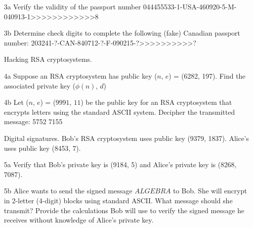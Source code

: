 \begin{question}{3a}
Verify the validity of the passport number
044455533-1-USA-460920-5-M-040913-1>>>>>>>>>>>>8
\end{question}

\begin{question}{3b}
Determine check digits to complete the following (fake) Canadian passport number:
203241-?-CAN-840712-?-F-090215-?>>>>>>>>>>?
\end{question}


\begin{question}{4}
Hacking RSA cryptosystems.
\end{question}

\begin{question}{4a}
Suppose an RSA cryptosystem has public key ($n$, $e$) = (6282, 197). Find the associated private key ($\phi(n)$, $d$)
\end{question}

\begin{question}{4b}
Let ($n$, $e$) = ($9991$, $11$) be the public key for an RSA cryptosystem that encrypts
letters using the standard ASCII system. Decipher the transmitted message: 5752 7155
\end{question}


\begin{question}{5}
Digital signatures. Bob's RSA cryptosystem uses public key (9379, 1837). Alice's uses
public key (8453, 7).
\end{question}

\begin{question}{5a}
Verify that Bob's private key is (9184, 5) and Alice's private key is (8268, 7087).
\end{question}

\begin{question}{5b}
Alice wants to send the signed message $ALGEBRA$ to Bob. She will encrypt in
2-letter (4-digit) blocks using standard ASCII. What message should she transmit? Provide
the calculations Bob will use to verify the signed message he receives without knowledge of
Alice's private key.
\end{question}





